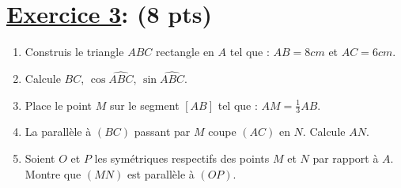 \documentclass[12pt,a4paper]{article}
\begin{document}
\section*{\underline{Exercice 3}: (8 pts)}

\begin{enumerate}
\item Construis le triangle $ABC$ rectangle en $A$ tel que : $AB = 8cm$ et $AC = 6cm$.  

\item Calcule $BC$, $\cos \widehat{ABC}$, $\sin \widehat{ABC}$.  

\item Place le point $M$ sur le segment $[AB]$ tel que : $AM = \frac{1}{3} AB$.  

\item La parallèle à $(BC)$ passant par $M$ coupe $(AC)$ en $N$. Calcule $AN$.  

\item Soient $O$ et $P$ les symétriques respectifs des points $M$ et $N$ par rapport à $A$. Montre que $(MN)$ est parallèle à $(OP)$.  
\end{enumerate}
\end{document}
